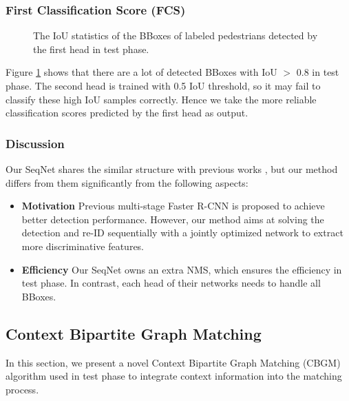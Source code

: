 \documentclass[letterpaper]{article} \usepackage{aaai21}  \usepackage{times}  \usepackage{helvet} \usepackage{courier}  \usepackage[hyphens]{url}  \usepackage{graphicx} \urlstyle{rm} \def\UrlFont{\rm}  \usepackage{natbib}  \usepackage{caption} \usepackage{multirow}
\begin{document}
\subsubsection{First Classification Score (FCS)}
\begin{figure}[t]
    \centering
    \resizebox{0.7\columnwidth}{!}
    {
    }
    \caption{The IoU statistics of the BBoxes of labeled pedestrians detected by the first head in test phase.}
    \label{iou_statistics}
\end{figure}
Figure \ref{iou_statistics} shows that there are a lot of detected BBoxes with IoU $>$ 0.8 in test phase. The second head is trained with 0.5 IoU threshold, so it may fail to classify these high IoU samples correctly. Hence we take the more reliable classification scores predicted by the first head as output.

\subsubsection{Discussion}
Our SeqNet shares the similar structure with previous works \cite{iterative-bbox1,iterative-bbox2,cascade-rcnn}, but our method differs from them significantly from the following aspects:

\begin{itemize}
    \item \textbf{Motivation} Previous multi-stage Faster R-CNN is proposed to achieve better detection performance. However, our method aims at solving the detection and re-ID sequentially with a jointly optimized network to extract more discriminative features.
    \item \textbf{Efficiency} Our SeqNet owns an extra NMS, which ensures the efficiency in test phase. In contrast, each head of their networks needs to handle all BBoxes.
\end{itemize}

\subsection{Context Bipartite Graph Matching}
In this section, we present a novel Context Bipartite Graph Matching (CBGM) algorithm used in test phase to integrate context information into the matching process.
\end{document}
